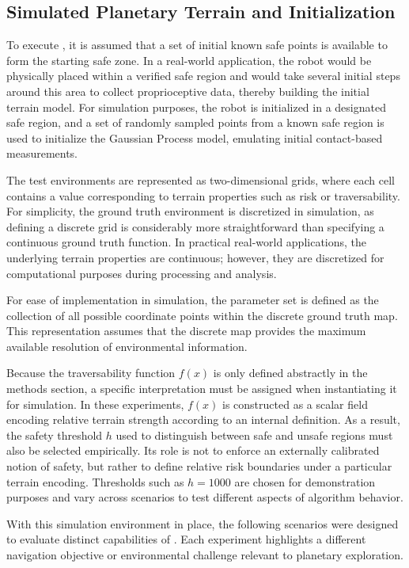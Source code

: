 \subsection{Simulated Planetary Terrain and Initialization}

To execute \algoname, it is assumed that a set of initial known safe points is available to form the starting safe zone. In a real-world application, the robot would be physically placed within a verified safe region and would take several initial steps around this area to collect proprioceptive data, thereby building the initial terrain model. For simulation purposes, the robot is initialized in a designated safe region, and a set of randomly sampled points from a known safe region is used to initialize the Gaussian Process model, emulating initial contact-based measurements.

The test environments are represented as two-dimensional grids, where each cell contains a value corresponding to terrain properties such as risk or traversability. For simplicity, the ground truth environment is discretized in simulation, as defining a discrete grid is considerably more straightforward than specifying a continuous ground truth function. In practical real-world applications, the underlying terrain properties are continuous; however, they are discretized for computational purposes during processing and analysis.

For ease of implementation in simulation, the parameter set is defined as the collection of all possible coordinate points within the discrete ground truth map. This representation assumes that the discrete map provides the maximum available resolution of environmental information.

Because the traversability function \( f(x) \) is only defined abstractly in the methods section, a specific interpretation must be assigned when instantiating it for simulation. In these experiments, \( f(x) \) is constructed as a scalar field encoding relative terrain strength according to an internal definition. As a result, the safety threshold \( h \) used to distinguish between safe and unsafe regions must also be selected empirically. Its role is not to enforce an externally calibrated notion of safety, but rather to define relative risk boundaries under a particular terrain encoding. Thresholds such as \( h = 1000 \) are chosen for demonstration purposes and vary across scenarios to test different aspects of algorithm behavior.

With this simulation environment in place, the following scenarios were designed to evaluate distinct capabilities of \algoname. Each experiment highlights a different navigation objective or environmental challenge relevant to planetary exploration.



